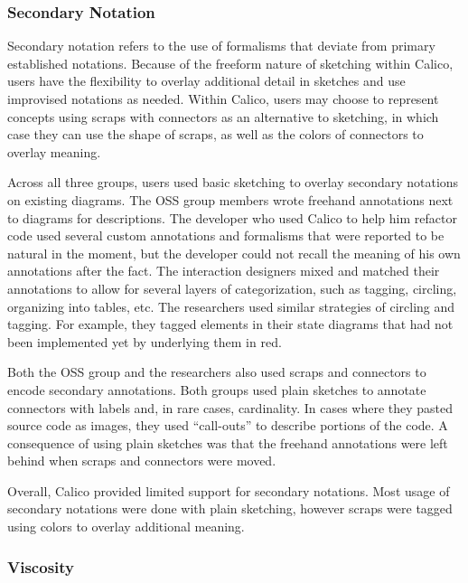 \subsubsection{Secondary Notation}

Secondary notation refers to the use of formalisms that deviate from primary established notations. Because of the freeform nature of sketching within Calico, users have the flexibility to overlay additional detail in sketches and use improvised notations as needed. Within Calico, users may choose to represent concepts using scraps with connectors as an alternative to sketching, in which case they can use the shape of scraps, as well as the colors of connectors to overlay meaning.

Across all three groups, users used basic sketching to overlay secondary notations on existing diagrams. The OSS group members wrote freehand annotations next to diagrams for descriptions. The developer who used Calico to help him refactor code used several custom annotations and formalisms that were reported to be natural in the moment, but the developer could not recall the meaning of his own annotations after the fact. The interaction designers mixed and matched their annotations to allow for several layers of categorization, such as tagging, circling, organizing into tables, etc. The researchers used similar strategies of circling and tagging. For example, they tagged elements in their state diagrams that had not been implemented yet by underlying them in red. 

Both the OSS group and the researchers also used scraps and connectors to encode secondary annotations. Both groups used plain sketches to annotate connectors with labels and, in rare cases, cardinality. In cases where they pasted source code as images, they used ``call-outs'' to describe portions of the code. A consequence of using plain sketches was that the freehand annotations were left behind when scraps and connectors were moved.

Overall, Calico provided limited support for secondary notations. Most usage of secondary notations were done with plain sketching, however scraps were tagged using colors to overlay additional meaning.


\subsubsection{Viscosity}

